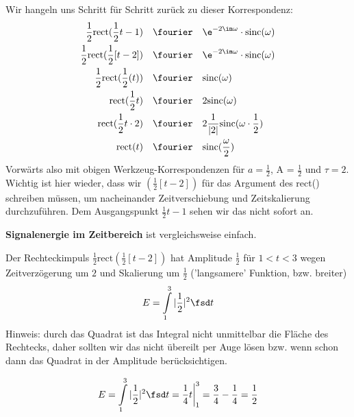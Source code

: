 \begin{ExCalc}
Wir hangeln uns Schritt für Schritt zurück zu dieser Korrespondenz:
\begin{align}
\frac{1}{2} \mathrm{rect}(\frac{1}{2}t - 1) &\quad\fourier\quad \e^{-2 \im \omega} \cdot \mathrm{sinc}(\omega)\\
\frac{1}{2} \mathrm{rect}(\frac{1}{2} [t - 2]) &\quad\fourier\quad \e^{-2 \im \omega} \cdot \mathrm{sinc}(\omega)\\
\frac{1}{2} \mathrm{rect}(\frac{1}{2} (t)) &\quad\fourier\quad \mathrm{sinc}(\omega)\\
\mathrm{rect}(\frac{1}{2} t) &\quad\fourier\quad 2 \mathrm{sinc}(\omega)\\
\mathrm{rect}(\frac{1}{2} t \cdot 2) &\quad\fourier\quad 2 \frac{1}{|2|} \mathrm{sinc}(\omega \cdot \frac{1}{2})\\
\mathrm{rect}(t) &\quad\fourier\quad \mathrm{sinc}(\frac{\omega}{2})
\end{align}
Vorwärts also mit obigen Werkzeug-Korrespondenzen für $a=\frac{1}{2}$, A = $\frac{1}{2}$ und $\tau=2$.
Wichtig ist hier wieder, dass wir $(\frac{1}{2} [t - 2])$ für das Argument des rect()
schreiben müssen, um nacheinander
Zeitverschiebung und Zeitskalierung durchzuführen. Dem Ausgangspunkt $\frac{1}{2}t - 1$
sehen wir das nicht sofort an.
\end{ExCalc}

\begin{Ansatz}
\textbf{Signalenergie im Zeitbereich} ist vergleichsweise einfach.

Der Rechteckimpuls $\frac{1}{2} \mathrm{rect}(\frac{1}{2} [t - 2])$ hat Amplitude
$\frac{1}{2}$ für $1 < t < 3$ wegen Zeitverzögerung um $2$ und Skalierung um $\frac{1}{2}$
('langsamere' Funktion, bzw. breiter)
%
\begin{equation}
  E = \int\limits_{1}^{3} |\frac{1}{2}|^2 \fsd t
\end{equation}
%
Hinweis: durch das Quadrat ist das Integral nicht unmittelbar die Fläche
des Rechtecks, daher sollten wir das nicht übereilt per Auge lösen bzw.
wenn schon dann das Quadrat in der Amplitude berücksichtigen.
\end{Ansatz}

\begin{ExCalc}
\begin{equation}
  E = \int\limits_{1}^{3} |\frac{1}{2}|^2 \fsd t = \frac{1}{4} t\bigg|_{1}^{3} =
  \frac{3}{4} - \frac{1}{4} = \frac{1}{2}
\end{equation}
\end{ExCalc}


